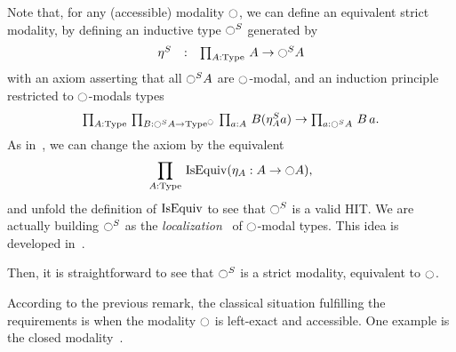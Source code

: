 \begin{rmq}
Note that, for any (accessible) modality $\ocircle$, we can define an equivalent
strict modality, by defining an inductive type $\ocircle^S$ generated by
\[ \left.
    \begin{array}{lll}
      \eta^S & : & \prod_{A:\operatorname{Type}}\, A \to \ocircle^S A \\
    \end{array}
    \right.
\]
with an axiom asserting that all $\ocircle^S A$ are $\ocircle$-modal, and
an induction principle restricted to $\ocircle$-modals types
{\large \[\textstyle{
  \prodD A \Type {%
    \prodD B {\modal^S A\to\Type^\modal}
      {\prodD a A {B(\eta^S_A a)} \to \prodD a {\modal^S A} {B\, a}%
      }%
    }%
}.\]}%
As in~\cite{shulman-localization}, we can change the axiom by the equivalent
\[
  \prod_{A:\operatorname{Type}}\, \operatorname{IsEquiv} (\eta_A : A \to \ocircle A),
\] and unfold the definition of $\operatorname{IsEquiv}$ to see that $\ocircle^S$ is a
valid HIT.
We are actually building $\ocircle^S$ as the {\em
  localization}~\cite[Definition 5.2.7.2]{lurie} of $\ocircle$-modal
types. This idea is developed in~\cite{shulman-mod-hits}.

Then, it is
straightforward to see that $\ocircle^S$ is a strict modality,
equivalent to $\ocircle$.
\end{rmq}

According to the previous remark, the classical situation fulfilling
the requirements is when the modality $\ocircle$ is left-exact and
accessible. One example is the closed
modality~\cite[Modalities/Closed.v]{hottlib}.

